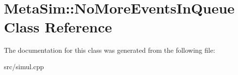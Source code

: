 \hypertarget{classMetaSim_1_1NoMoreEventsInQueue}{}\section{Meta\+Sim\+:\+:No\+More\+Events\+In\+Queue Class Reference}
\label{classMetaSim_1_1NoMoreEventsInQueue}


The documentation for this class was generated from the following file\+:\begin{DoxyCompactItemize}
\item 
src/simul.\+cpp\end{DoxyCompactItemize}
